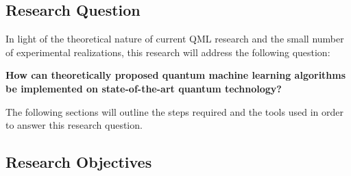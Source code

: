 \documentclass[a4paper]{article}
\newcommand*{\0}{$\ket{0}$}
\newcommand*{\1}{$\ket{1}$}
\begin{document}

\subsection{Research Question}
\label{subsec:researchquestion}

In light of the theoretical nature of current QML research and the small number of experimental realizations, this research will address the following question:
 
\centering\textbf{How can theoretically proposed quantum machine learning algorithms be implemented on state-of-the-art quantum technology?}


\flushleft
The following sections will outline the steps required and the tools used in order to answer this research question. 

\subsection{Research Objectives}
\label{subsec:researchobjectives}
\end{document}
